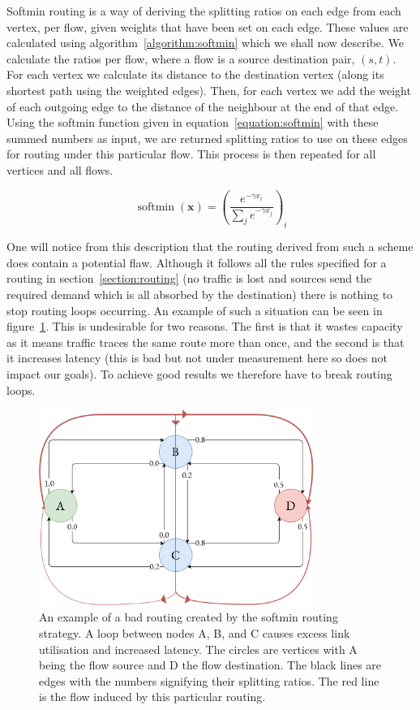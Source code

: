 Softmin routing is a way of deriving the splitting ratios on each edge from each vertex, per flow, given weights that have been set on each edge. These values are calculated using algorithm~\ref{algorithm:softmin} which we shall now describe. We calculate the ratios per flow, where a flow is a source destination pair, $(s,t)$. For each vertex we calculate its distance to the destination vertex (along its shortest path using the weighted edges). Then, for each vertex we add the weight of each outgoing edge to the distance of the neighbour at the end of that edge. Using the softmin function given in equation~\ref{equation:softmin} with these summed numbers as input, we are returned splitting ratios to use on these edges for routing under this particular flow. This process is then repeated for all vertices and all flows.

\begin{equation}
  \label{equation:softmin}
  \operatorname{softmin}(\bm{x}) = \left(\frac{e^{-\gamma x_i}}{\sum_{j}{e^{-\gamma x_j}}}\right)_i
\end{equation}

One will notice from this description that the routing derived from such a scheme does contain a potential flaw. Although it follows all the rules specified for a routing in section~\ref{section:routing} (no traffic is lost and sources send the required demand which is all absorbed by the destination) there is nothing to stop routing loops occurring. An example of such a situation can be seen in figure~\ref{fig:bad_route}. This is undesirable for two reasons. The first is that it wastes capacity as it means traffic traces the same route more than once, and the second is that it increases latency (this is bad but not under measurement here so does not impact our goals). To achieve good results we therefore have to break routing loops.

\begin{figure}
    \centering
    \includegraphics[width=0.8\textwidth]{figures/bad_route.pdf}
    \caption{An example of a bad routing created by the softmin routing strategy. A loop between nodes A, B, and C causes excess link utilisation and increased latency. The circles are vertices with A being the flow source and D the flow destination. The black lines are edges with the numbers signifying their splitting ratios. The red line is the flow induced by this particular routing.}
    \label{fig:bad_route}
\end{figure}


